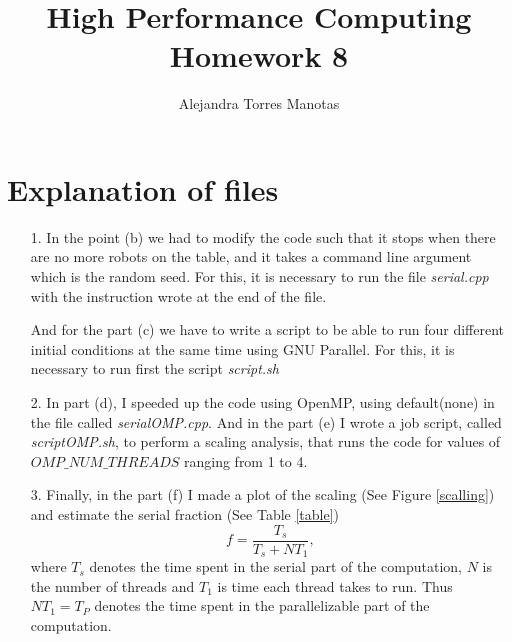 \documentclass[]{article}
\title{High Performance Computing Homework 8}
\author{Alejandra Torres Manotas}
\begin{document}
\maketitle

\section{Explanation of files}

\begin{itemize}
	\item[1.] In the point (b) we had to modify the code such that it stops when there are no more robots on the table, and it takes a command line argument which is the random seed. For this, it is necessary to run the file \textit{serial.cpp} with the instruction wrote at the end of the file. 
	
	And for the part (c) we have to write a script to be able to run four different initial conditions at the same time using GNU Parallel. For this, it is necessary to run first the script \textit{script.sh}
	
	\item[2.] In part (d), I speeded up the code using OpenMP, using default(none) in the file called \textit{serialOMP.cpp}. And in the part (e) I wrote a job script, called \textit{scriptOMP.sh}, to perform a scaling analysis, that runs the code for values of $OMP\_NUM\_THREADS$
	ranging from 1 to 4.
	
	\item[3.] Finally, in the part (f) I made a plot of the scaling (See Figure \ref{scalling}) and estimate the serial fraction (See Table \ref{table})
	\begin{equation*}
		f=\dfrac{T_s}{T_s+NT_1},
	\end{equation*}
	where $T_s$ denotes the time spent in the serial part of the computation, $N$ is the number of threads and $T_1$ is time
	each thread takes to run. Thus $NT_1 = T_P$ denotes the time spent in the parallelizable part of the computation.
	

\end{itemize}
\end{document}

